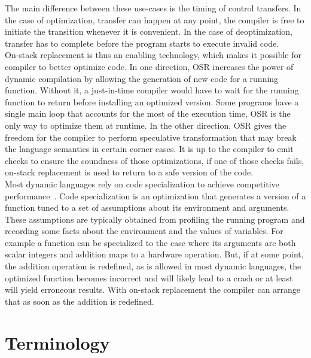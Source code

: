 The main difference between these use-cases is the timing of control transfers.
In the case of optimization, transfer can happen at any point, the compiler is free to initiate the transition whenever it is convenient.
In the case of deoptimization, transfer has to complete before the program starts to execute invalid code.\\

On-stack replacement is thus an enabling technology, which makes it possible
for compiler to better optimize code.  In one direction, OSR increases the
power of dynamic compilation by allowing the generation of new code for a
running function. Without it, a just-in-time compiler would have to wait for
the running function to return before installing an optimized version.  Some
programs have a single main loop that accounts for the most of the execution
time, OSR is the only way to optimize them at runtime. In the other
direction, OSR gives the freedom for the compiler to perform speculative
transformation that may break the language semantics in certain corner
cases. It is up to the compiler to emit checks to ensure the soundness of
those optimizations, if one of those checks fails, on-stack replacement is
used to return to a safe version of the code.\\

Most dynamic languages rely on code specialization to achieve competitive
performance~\cite{gal2009trace}. Code specialization is an optimization that
generates a version of a function tuned to a set of assumptions about its
environment and arguments. These assumptions are typically obtained from
profiling the running program and recording some facts about the environment
and the values of variables. For example a function can be specialized to
the case where its arguments are both scalar integers and addition maps to
a hardware operation. But, if at some point, the addition operation is
redefined, as is allowed in most dynamic languages, the optimized function
becomes incorrect and will likely lead to a crash or at least will yield
erroneous results.  With on-stack replacement the compiler can arrange that
as soon as the addition is redefined.\\


\section{Terminology}

